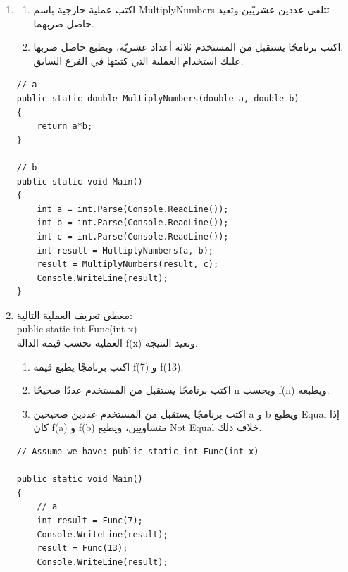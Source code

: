 ﻿\documentclass[12pt]{article}
\begin{document}
\begin{enumerate}[itemsep=3em]
\begin{enumerate}
\clearpage
\item
\begin{enumerate}
    \item اكتب عملية خارجية باسم \textenglish{MultiplyNumbers} تتلقى عددين عشريّين وتعيد حاصل ضربهما.
    \item اكتب برنامجًا يستقبل من المستخدم ثلاثة أعداد عشريّة، ويطبع حاصل ضربها. \\
    عليك استخدام العملية التي كتبتها في الفرع السابق.
\end{enumerate}
\ifwithsols
\begin{boxSolution}
\begin{english}
\begin{verbatim}
// a
public static double MultiplyNumbers(double a, double b)
{
    return a*b;
}

// b
public static void Main()
{
    int a = int.Parse(Console.ReadLine());
    int b = int.Parse(Console.ReadLine());
    int c = int.Parse(Console.ReadLine());
    int result = MultiplyNumbers(a, b);
    result = MultiplyNumbers(result, c);
    Console.WriteLine(result);
}
\end{verbatim}
\end{english}
\end{boxSolution}
\clearpage
\fi

\item
معطى تعريف العملية التالية: \\
\textenglish{public static int Func(int x)} \\
العملية تحسب قيمة الدالة \textenglish{f(x)} وتعيد النتيجة.

\begin{enumerate}
\item اكتب برنامجًا يطبع قيمة \textenglish{f(7)} و \textenglish{f(13)}.
\item اكتب برنامجًا يستقبل من المستخدم عددًا صحيحًا \textenglish{n} ويحسب \textenglish{f(n)} ويطبعه.
\item اكتب برنامجًا يستقبل من المستخدم عددين صحيحين \textenglish{a} و \textenglish{b} ويطبع \textenglish{Equal} إذا كان \textenglish{f(a)} و \textenglish{f(b)} متساويين، ويطبع \textenglish{Not Equal} خلاف ذلك.
\end{enumerate}

\ifwithsols
\begin{boxSolution}
\begin{english}
\begin{verbatim}
// Assume we have: public static int Func(int x)

public static void Main()
{
    // a
    int result = Func(7);
    Console.WriteLine(result);
    result = Func(13);
    Console.WriteLine(result);


\end{verbatim}
\end{english}
\end{boxSolution}
\end{enumerate}
\end{enumerate}
\end{document}
